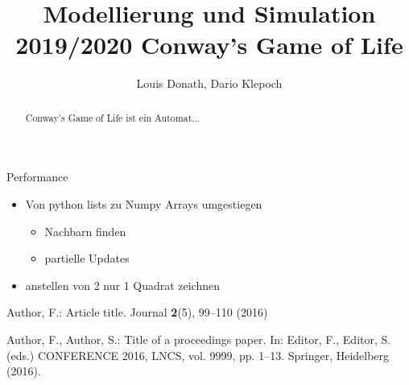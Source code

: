 \documentclass[runningheads]{llncs}
\begin{document}
%
\title{Modellierung und Simulation 2019/2020 Conway's Game of Life}
%
%
\author{Louis Donath, Dario Klepoch}
%
\authorrunning{}
%
%
\maketitle              %
%
\begin{abstract}
Conway's Game of Life ist ein Automat...
\end{abstract}
%

\begin{section}{Performance}
    \begin{itemize}
        \item Von python lists zu Numpy Arrays umgestiegen
        \begin{itemize}
            \item Nachbarn finden 
            \item partielle Updates 
        \end{itemize}
        \item anstellen von 2 nur 1 Quadrat zeichnen
    \end{itemize}
\end{section}

% 
% 
%
\begin{thebibliography}{8}
Author, F.: Article title. Journal \textbf{2}(5), 99--110 (2016)

Author, F., Author, S.: Title of a proceedings paper. In: Editor,
F., Editor, S. (eds.) CONFERENCE 2016, LNCS, vol. 9999, pp. 1--13.
Springer, Heidelberg (2016). 


\end{thebibliography}
\end{document}
